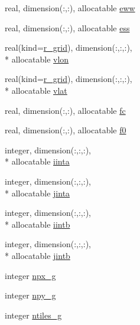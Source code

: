\begin{DoxyCompactItemize}
\item 
real, dimension(\-:,\-:), allocatable \hyperlink{structfv__arrays__mod_1_1fv__grid__type_a0f16d115d609b95b647e85c869f44cb4}{eww}
\item 
real, dimension(\-:,\-:), allocatable \hyperlink{structfv__arrays__mod_1_1fv__grid__type_a1233e425c20ba7a2cc6aa0e46ed5015c}{ess}
\item 
real(kind=\hyperlink{classfv__arrays__mod_ab0ba8527d270f349a84fa0a330be1923}{r\-\_\-grid}), dimension(\-:,\-:,\-:), \\*
allocatable \hyperlink{structfv__arrays__mod_1_1fv__grid__type_a9e8faf63c65b7ca992a2dad1b701a9a1}{vlon}
\item 
real(kind=\hyperlink{classfv__arrays__mod_ab0ba8527d270f349a84fa0a330be1923}{r\-\_\-grid}), dimension(\-:,\-:,\-:), \\*
allocatable \hyperlink{structfv__arrays__mod_1_1fv__grid__type_a1803ca537d8deb8d97f34e16e187eceb}{vlat}
\item 
real, dimension(\-:,\-:), allocatable \hyperlink{structfv__arrays__mod_1_1fv__grid__type_ad6b4cc197da201ef2c31815f3a8a5411}{fc}
\item 
real, dimension(\-:,\-:), allocatable \hyperlink{structfv__arrays__mod_1_1fv__grid__type_a99276efaf78d2df4d372cc3611f100b9}{f0}
\item 
integer, dimension(\-:,\-:,\-:), \\*
allocatable \hyperlink{structfv__arrays__mod_1_1fv__grid__type_ad30036fbd902aa2718013d156a6c2185}{iinta}
\item 
integer, dimension(\-:,\-:,\-:), \\*
allocatable \hyperlink{structfv__arrays__mod_1_1fv__grid__type_a60627dd7ae4d9f748f6488474f45b1a0}{jinta}
\item 
integer, dimension(\-:,\-:,\-:), \\*
allocatable \hyperlink{structfv__arrays__mod_1_1fv__grid__type_af6e4fbd753eb431fc0972ba9811013bb}{iintb}
\item 
integer, dimension(\-:,\-:,\-:), \\*
allocatable \hyperlink{structfv__arrays__mod_1_1fv__grid__type_a4db483ba3f01be9b80617591e298a688}{jintb}
\item 
integer \hyperlink{structfv__arrays__mod_1_1fv__grid__type_a3ac366c0cf8c63dcbbd3a43eec0f0c35}{npx\-\_\-g}
\item 
integer \hyperlink{structfv__arrays__mod_1_1fv__grid__type_ae56168963555f3c32a62a270549c7a56}{npy\-\_\-g}
\item 
integer \hyperlink{structfv__arrays__mod_1_1fv__grid__type_a8d3c5fd98c0347c22e1491e22d2aca0c}{ntiles\-\_\-g}

\end{DoxyCompactItemize}
